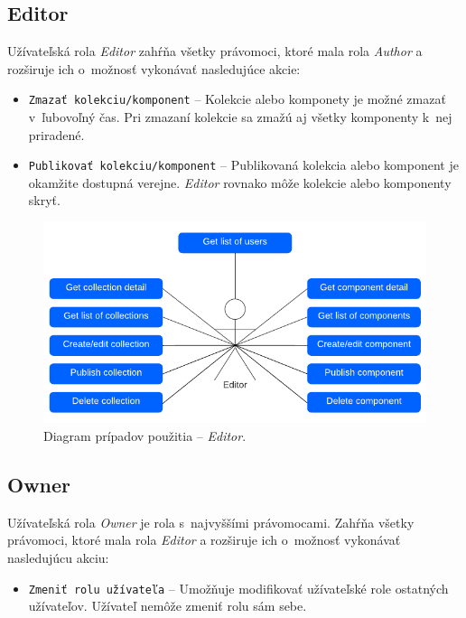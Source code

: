 \subsection{Editor}
Užívateľská rola \emph{Editor} zahŕňa všetky právomoci, ktoré mala rola \emph{Author} a rozširuje ich o~možnosť vykonávať nasledujúce akcie:

\begin{itemize}
	\item \texttt{Zmazať kolekciu/komponent} -- Kolekcie alebo komponety je možné zmazať v~ľubovoľný čas. Pri zmazaní kolekcie sa zmažú aj všetky komponenty k~nej priradené.
	\item \texttt{Publikovať kolekciu/komponent} -- Publikovaná kolekcia alebo komponent je okamžite dostupná verejne. \emph{Editor} rovnako môže kolekcie alebo komponenty skryť.
\end{itemize}

\begin{figure}[H]
	\centering
	\includegraphics[scale=0.9]{obrazky-figures/editor_use_case}
	\caption{Diagram prípadov použitia -- \emph{Editor}.}
\end{figure}

\subsection{Owner}
Užívateľská rola \emph{Owner} je rola s~najvyššími právomocami. Zahŕňa všetky právomoci, ktoré mala rola \emph{Editor} a rozširuje ich o~možnosť vykonávať nasledujúcu akciu:

\begin{itemize}
	\item \texttt{Zmeniť rolu užívateľa} -- Umožňuje modifikovať užívateľské role ostatných užívateľov. Užívateľ nemôže zmeniť rolu sám sebe. 
\end{itemize}


